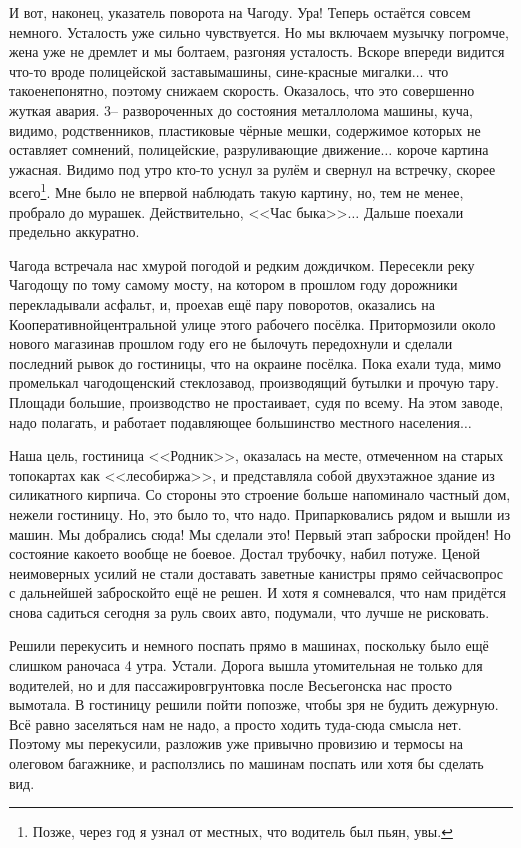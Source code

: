 И вот, наконец, указатель поворота на Чагоду. Ура! Теперь остаётся совсем немного. Усталость уже сильно чувствуется. Но мы включаем музычку погромче, жена уже не дремлет и мы болтаем, разгоняя усталость. Вскоре впереди видится что-то вроде полицейской заставы\mdash машины, сине-красные мигалки$\ldots$ что такое\mdash непонятно, поэтому снижаем скорость. Оказалось, что это совершенно жуткая авария. 3\thinspace\nobreakdash-- развороченных до состояния металлолома машины, куча, видимо, родственников, пластиковые чёрные мешки, содержимое которых не оставляет сомнений, полицейские, разруливающие движение$\ldots$ короче картина ужасная. Видимо под утро кто-то уснул за рулём и свернул на встречку, скорее всего\footnote{Позже, через год я узнал от местных, что водитель был пьян, увы.}. Мне было не впервой наблюдать такую картину, но, тем не менее, пробрало до мурашек. Действительно, <<Час быка>>$\ldots$ Дальше поехали предельно аккуратно.

Чагода встречала нас хмурой погодой и редким дождичком. Пересекли реку Чагодощу по тому самому мосту, на котором в прошлом году дорожники перекладывали асфальт, и, проехав ещё пару поворотов, оказались на Кооперативной\mdash центральной улице этого рабочего посёлка. Притормозили около нового магазина\mdash в прошлом году его не было\mdash чуть передохнули и сделали последний рывок до гостиницы, что на окраине посёлка. Пока ехали туда, мимо промелькал чагодощенский стеклозавод, производящий бутылки и прочую тару. Площади большие, производство не простаивает, судя по всему. На этом заводе, надо полагать, и работает подавляющее большинство местного населения$\ldots$

Наша цель, гостиница <<Родник>>, оказалась на месте, отмеченном на старых топокартах как <<лесобиржа>>, и представляла собой двухэтажное здание из силикатного кирпича. Со стороны это строение больше напоминало частный дом, нежели гостиницу. Но, это было то, что надо. Припарковались рядом и вышли из машин. Мы добрались сюда! Мы сделали это! Первый этап заброски пройден! Но состояние какое\sdash то вообще не боевое. Достал трубочку, набил потуже. Ценой неимоверных усилий не стали доставать заветные канистры прямо сейчас\mdash вопрос с дальнейшей заброской\sdash то ещё не решен. И хотя я сомневался, что нам придётся снова садиться сегодня за руль своих авто, подумали, что лучше не рисковать. 

Решили перекусить и немного поспать прямо в машинах, поскольку было ещё слишком рано\mdash часа 4 утра. Устали. Дорога вышла утомительная не только для водителей, но и для пассажиров\mdash грунтовка после Весьегонска нас просто вымотала. В гостиницу решили пойти попозже, чтобы зря не будить дежурную. Всё равно заселяться нам не надо, а просто ходить туда-сюда смысла нет. Поэтому мы перекусили, разложив уже привычно провизию и термосы на олеговом багажнике, и расползлись по машинам поспать или хотя бы сделать вид. 

